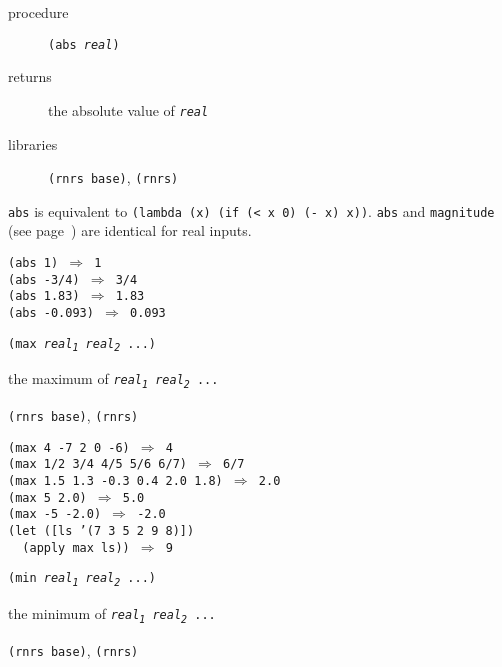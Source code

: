 \begin{description}

\label{objects_s105}\label{objects_page_abs}
\item[procedure] \texttt{(abs \textit{real})}



\item[returns] the absolute value of \texttt{\textit{real}}


\item[libraries] \texttt{(rnrs base)}, \texttt{(rnrs)}
\end{description}

\texttt{abs} is equivalent to \texttt{(lambda (x) (if (\textless{} x 0) (- x) x))}.
\texttt{abs} and \label{objects_s106}\texttt{magnitude}
(see page \pageref{objects_page_magnitude}) are identical for real inputs.

\begin{alltt}
(abs 1) \(\Rightarrow\) 1
(abs -3/4) \(\Rightarrow\) 3/4
(abs 1.83) \(\Rightarrow\) 1.83
(abs -0.093) \(\Rightarrow\) 0.093
\end{alltt}

\begin{description}

\label{objects_s107}\item[procedure] \texttt{(max \textit{real\textsubscript{1}} \textit{real\textsubscript{2}} ...)}



\item[returns] the maximum of \texttt{\textit{real\textsubscript{1}} \textit{real\textsubscript{2}} ...}


\item[libraries] \texttt{(rnrs base)}, \texttt{(rnrs)}
\end{description}


\begin{alltt}
(max 4 -7 2 0 -6) \(\Rightarrow\) 4
(max 1/2 3/4 4/5 5/6 6/7) \(\Rightarrow\) 6/7
(max 1.5 1.3 -0.3 0.4 2.0 1.8) \(\Rightarrow\) 2.0
(max 5 2.0) \(\Rightarrow\) 5.0
(max -5 -2.0) \(\Rightarrow\) -2.0
(let ([ls '(7 3 5 2 9 8)])
  (apply max ls)) \(\Rightarrow\) 9
\end{alltt}

\begin{description}

\label{objects_s108}\item[procedure] \texttt{(min \textit{real\textsubscript{1}} \textit{real\textsubscript{2}} ...)}



\item[returns] the minimum of \texttt{\textit{real\textsubscript{1}} \textit{real\textsubscript{2}} ...}


\item[libraries] \texttt{(rnrs base)}, \texttt{(rnrs)}
\end{description}


